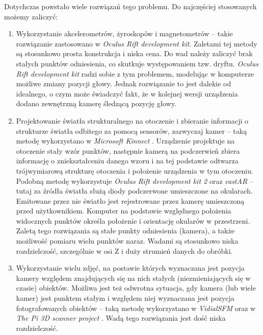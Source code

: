 Dotychczas powstało wiele rozwiązań tego problemu. Do najczęściej stosowanych możemy zaliczyć:
\begin{enumerate}
 \item 
 Wykorzystanie akcelerometrów, żyroskopów i magnetometrów -- 
takie rozwiązanie zastosowano w \textit{Oculus Rift development kit}. Zaletami tej metody są stosunkowo
prosta konstrukcja i niska cena.
Do wad należy zaliczyć brak stałych punktów odniesienia, co skutkuje występowaniem tzw. dryftu.
\textit{Oculus Rift development kit} radzi sobie z tym problemem, modelując w komputerze możliwe zmiany pozycji głowy.
Jednak rozwiązanie to jest dalekie od idealnego, o czym może świadczyć fakt, że w kolejnej wersji 
urządzenia dodano zewnętrzną kamerę śledzącą pozycję głowy.

\item \label{itm:second_method}
 Projektowanie światła strukturalnego na otoczenie i zbieranie informacji o strukturze 
 światła odbitego za pomocą sensorów, zazwyczaj kamer -- 
 taką metodę wykorzystano w \textit{Microsoft Kinnect} \cite{bib:MicrosoftKinect}.
 Urządzenie projektuje na otoczenie stały wzór punktów, następnie kamerą na podczerwień
 zbiera informację o zniekształceniu danego wzoru i na tej podstawie odtwarza  
 trójwymiarową strukturę otoczenia i położenie urządzenia w tym otoczeniu.
 Podobną metodę wykorzystuje \textit{Oculus Rift development kit 2} \cite{bib:OculusRiftDK2} oraz 
 \textit{castAR} \cite{bib:castAR} -- tutaj za źródła światła służą diody podczerwone umieszczone na okularach.
 Emitowane przez nie światło jest rejestrowane przez kamerę umieszczoną przed użytkownikiem.
 Komputer na podstawie względnego położenia widocznych punktów określa położenie i orientację
 okularów w przestrzeni.
 Zaletą tego rozwiązania są stałe punkty odniesienia (kamera), a także możliwość pomiaru wielu punktów naraz.
 Wadami są stosunkowo niska rozdzielczość, szczególnie w osi Z i duży strumień danych do obróbki.

\item
 Wykorzystanie wielu zdjęć, na postawie których 
 wyznaczana jest pozycja kamery względem znajdujących się na nich  stałych (niezmieniających się w czasie) obiektów. 
 Możliwa jest też odwrotna sytuacja, gdy  
  kamera (lub wiele kamer) jest punktem stałym i względem niej wyznaczana jest pozycja fotografowanych obiektów --   
 taką metodę wykorzystano w \textit{VidialSFM} \cite{bib:VisualSFM} oraz w \textit{The Pi 3D scanner project} \cite{bib:pi3dscan}. 
 Wadą tego rozwiązania jest dość niska rozdzielczość.
 

\end{enumerate}
